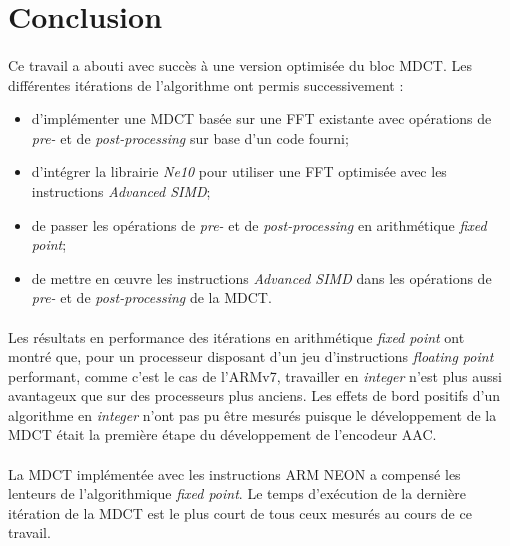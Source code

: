 \documentclass{article}
\begin{document}
    \newpage
    \section*{Conclusion}
    \paragraph{}
    Ce travail a abouti avec succès à une version optimisée du bloc MDCT. Les différentes itérations de l'algorithme ont permis successivement :
    \begin{itemize}
        \item d'implémenter une MDCT basée sur une FFT existante avec opérations de \emph{pre-} et de \emph{post-processing} sur base d'un code fourni;
        \item d'intégrer la librairie \emph{Ne10} pour utiliser une FFT optimisée avec les instructions \emph{Advanced SIMD};
        \item de passer les opérations de \emph{pre-} et de \emph{post-processing} en arithmétique \emph{fixed point};
        \item de mettre en \oe uvre les instructions \emph{Advanced SIMD} dans les opérations de \emph{pre-} et de \emph{post-processing} de la MDCT.
    \end{itemize}

    \paragraph{}
    Les résultats en performance des itérations en arithmétique \emph{fixed point} ont montré que, pour un processeur disposant d'un jeu d'instructions \emph{floating point} performant, comme c'est le cas de l'ARMv7, travailler en \emph{integer} n'est plus aussi avantageux que sur des processeurs plus anciens. Les effets de bord positifs d'un algorithme en \emph{integer} n'ont pas pu être mesurés puisque le développement de la MDCT était la première étape du développement de l'encodeur AAC.

    \paragraph{}
    La MDCT implémentée avec les instructions ARM NEON a compensé les lenteurs de l'algorithmique \emph{fixed point}. Le temps d'exécution de la dernière itération de la MDCT est le plus court de tous ceux mesurés au cours de ce travail.
\end{document}
